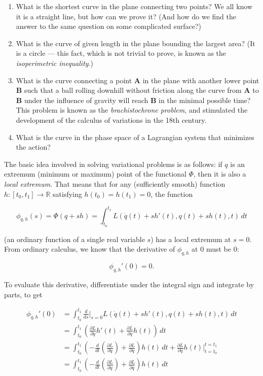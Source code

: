 \documentclass[11pt]{report}
\newcommand{\R}{\mathbb{R}}
\theoremstyle{plain}
\theoremstyle{definition}
\begin{document}
\begin{enumerate}[label=\arabic*.]
\item What is the shortest curve in the plane connecting
two points? We all know it is a straight line, but how
can we prove it? (And how do we find the answer to the
same question on some complicated surface?)

\item What is the curve of given length in the plane
bounding the largest area? (It is a circle --- this
fact, which is not trivial to prove, is known as the
\emph{isoperimetric inequality}.)

\item What is the curve connecting a point $\mathbf{A}$ in
the plane with another lower point $\mathbf{B}$ such
that a ball rolling downhill without friction along
the curve from $\mathbf{A}$ to $\mathbf{B}$ under the
influence of gravity will reach $\mathbf{B}$ in the
minimal possible time? This problem is known as the
\emph{brachistochrone problem}, and stimulated the
development of the calculus of variations in the 18th
century.

\item What is the curve in the phase space of a Lagrangian
system that minimizes the action?
\end{enumerate}

The basic idea involved in solving variational
problems is as follows: if $q$ is an extremum
(minimum or maximum) point of the functional $\Phi$,
then it is also a \emph{local extremum}. That means that
for any (sufficiently smooth) function
$h:[t_0,t_1]\to \R$ satisfying $h(t_0)=h(t_1)=0$, the
function

\[
\phi_{q,h}(s) = \Phi(q+s h)=\int_{t_0}^{t_1} L(\dot{q}(t)+sh'(t),q(t)+sh(t),t)\,dt
\]

(an ordinary function of a single real variable $s$)
has a local extremum at $s=0$. From ordinary
calculus, we know that the derivative of $\phi_{q,h}$
at $0$ must be $0$:

\[
\phi_{q,h}'(0) = 0.
\]

To evaluate this derivative, differentiate under the
integral sign and integrate by parts, to get

\begin{align*}
\phi_{q,h}'(0)
&=
\int_{t_0}^{t_1} \frac{d}{ds} \Big|_{s=0}  L(\dot{q}(t)+sh'(t),q(t)+sh(t),t)\,dt
\\
&= \int_{t_0}^{t_1} \left(\frac{\partial L}{\partial \dot{q}} h'(t) + \frac{\partial L}{\partial q} h(t) \right)\,dt \\
&=
\int_{t_0}^{t_1} \left(-\frac{d}{dt}\left(\frac{\partial L}{\partial \dot{q}}\right) + \frac{\partial L}{\partial q} \right)h(t)\,dt
+ \frac{\partial L}{\partial \dot{q}} h(t)\Big|_{t=t_0}^{t=t_1} \\
&= \int_{t_0}^{t_1} \left(-\frac{d}{dt}\left(\frac{\partial L}{\partial \dot{q}}\right) + \frac{\partial L}{\partial q} \right)h(t)\,dt
\end{align*}
\end{document}
